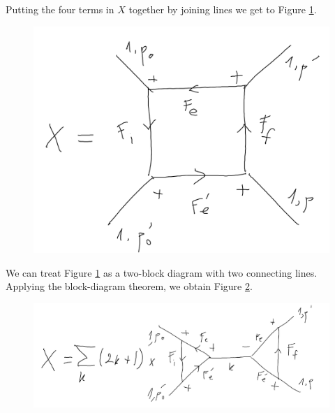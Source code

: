 \documentclass[11pt]{article}
\begin{document}
Putting the four terms in $X$ together by joining lines we get to Figure \ref{fig:X2}.
\begin{figure}[!htb]
	\centering
	\includegraphics[scale=0.3]{draw_ang_2}
	\caption{}
	\label{fig:X2}
\end{figure}

We can treat Figure \ref{fig:X2} as a two-block diagram with two connecting lines. Applying the block-diagram theorem, we obtain Figure \ref{fig:X3}. 
\begin{figure}[!htb]
	\centering
	\includegraphics[scale=0.4]{draw_ang_3}
	\caption{}
	\label{fig:X3}
\end{figure}
\end{document}
